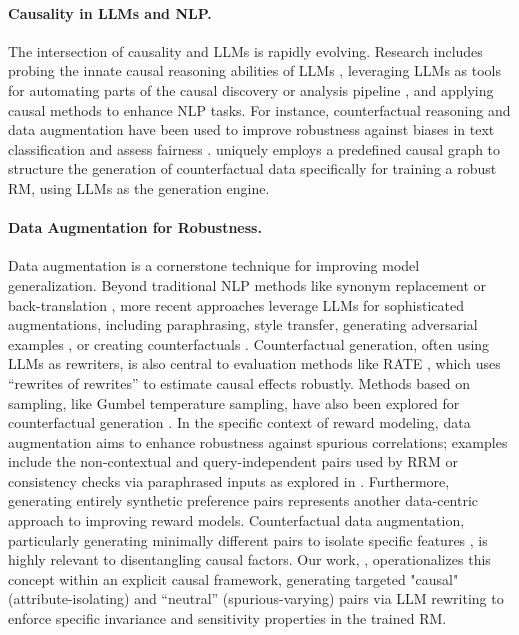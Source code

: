 \paragraph{Causality in LLMs and NLP.}
The intersection of causality and LLMs is rapidly evolving. Research includes probing the innate causal reasoning abilities of LLMs \citep{kiciman2023causal, chi2024unveiling}, leveraging LLMs as tools for automating parts of the causal discovery or analysis pipeline \citep{long2023causal, tu2023causal}, and applying causal methods to enhance NLP tasks. For instance, counterfactual reasoning and data augmentation have been used to improve robustness against biases in text classification \citep{kaushik2019learning, feder2021causalm} and assess fairness \citep{feder2022causal}. \carma{} uniquely employs a predefined causal graph to structure the generation of counterfactual data specifically for training a robust RM, using LLMs as the generation engine.

\paragraph{Data Augmentation for Robustness.}
Data augmentation is a cornerstone technique for improving model generalization. Beyond traditional NLP methods like synonym replacement or back-translation \citep{wu2025rewordbench}, more recent approaches leverage LLMs for sophisticated augmentations, including paraphrasing, style transfer, generating adversarial examples \citep{qiang2024prompt}, or creating counterfactuals \citep{mishra2024llm, feder2021causalm}. Counterfactual generation, often using LLMs as rewriters, is also central to evaluation methods like RATE \citep{reber2024rate}, which uses ``rewrites of rewrites'' to estimate causal effects robustly. Methods based on sampling, like Gumbel temperature sampling, have also been explored for counterfactual generation \citep{ravfogel2025gumbelcounterfactualgenerationlanguage}. In the specific context of reward modeling, data augmentation aims to enhance robustness against spurious correlations; examples include the non-contextual and query-independent pairs used by RRM \citep{liu2024rrm} or consistency checks via paraphrased inputs as explored in \rewordbench{} \citep{wu2025rewordbench}. Furthermore, generating entirely synthetic preference pairs \citep{pace2024west, shen2024boosting} represents another data-centric approach to improving reward models. Counterfactual data augmentation, particularly generating minimally different pairs to isolate specific features \citep{kaushik2019learning}, is highly relevant to disentangling causal factors. Our work, \carma{}, operationalizes this concept within an explicit causal framework, generating targeted "causal" (attribute-isolating) and ``neutral'' (spurious-varying) pairs via LLM rewriting to enforce specific invariance and sensitivity properties in the trained RM.

